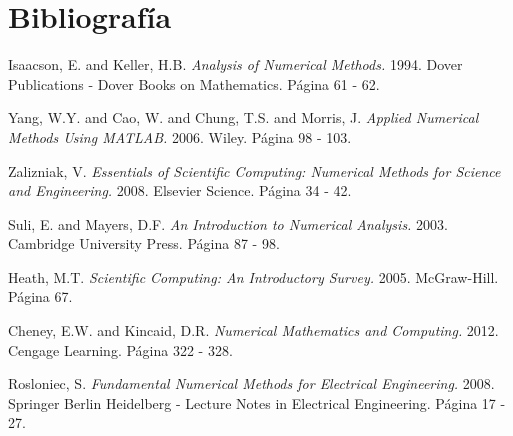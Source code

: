 \documentclass[11pt, spanish]{article}
\begin{document}
\section{Bibliografía}

\begingroup
\renewcommand{\section}[2]{}%
\begin{thebibliography}{}

 Isaacson, E. and Keller, H.B. {\em Analysis of Numerical Methods.} 1994. Dover Publications - Dover Books on Mathematics. Página 61 - 62.

 Yang, W.Y. and Cao, W. and Chung, T.S. and Morris, J. {\em Applied Numerical Methods Using MATLAB.} 2006. Wiley. Página 98 - 103.

 Zalizniak, V. {\em Essentials of Scientific Computing: Numerical Methods for Science and Engineering.} 2008. Elsevier Science. Página 34 - 42.

 Suli, E. and Mayers, D.F. {\em An Introduction to Numerical Analysis.} 2003. Cambridge University Press. Página 87 - 98.

 Heath, M.T. {\em Scientific Computing: An Introductory Survey.} 2005. McGraw-Hill. Página 67.

 Cheney, E.W. and Kincaid, D.R. {\em Numerical Mathematics and Computing.} 2012. Cengage Learning. Página 322 - 328.

 Rosloniec, S. {\em Fundamental Numerical Methods for Electrical Engineering.} 2008. Springer Berlin Heidelberg - Lecture Notes in Electrical Engineering. Página 17 - 27.



\end{thebibliography}
\endgroup

\newpage
\section{Scripts}



\newpage





\newpage



\lstlistoflistings


\end{document}

